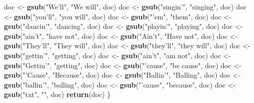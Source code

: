 \documentclass[]{article}
\newenvironment{Shaded}{\begin{snugshade}}{\end{snugshade}}
\newcommand{\KeywordTok}[1]{\textcolor[rgb]{0.13,0.29,0.53}{\textbf{#1}}}
\newcommand{\NormalTok}[1]{#1}
\newcommand{\StringTok}[1]{\textcolor[rgb]{0.31,0.60,0.02}{#1}}
\begin{document}
\begin{Shaded}
\begin{Highlighting}[]
\NormalTok{  doc <-}\StringTok{ }\KeywordTok{gsub}\NormalTok{(}\StringTok{"We'll"}\NormalTok{, }\StringTok{"We will"}\NormalTok{, doc)}
\NormalTok{  doc <-}\StringTok{ }\KeywordTok{gsub}\NormalTok{(}\StringTok{"singin'"}\NormalTok{, }\StringTok{"singing"}\NormalTok{, doc)}
\NormalTok{  doc <-}\StringTok{ }\KeywordTok{gsub}\NormalTok{(}\StringTok{"you'll"}\NormalTok{, }\StringTok{"you will"}\NormalTok{, doc)}
\NormalTok{  doc <-}\StringTok{ }\KeywordTok{gsub}\NormalTok{(}\StringTok{"'em"}\NormalTok{, }\StringTok{"them"}\NormalTok{, doc)}
\NormalTok{  doc <-}\StringTok{ }\KeywordTok{gsub}\NormalTok{(}\StringTok{"dancin'"}\NormalTok{, }\StringTok{"dancing"}\NormalTok{, doc)}
\NormalTok{  doc <-}\StringTok{ }\KeywordTok{gsub}\NormalTok{(}\StringTok{"playin'"}\NormalTok{, }\StringTok{"playing"}\NormalTok{, doc)}
\NormalTok{  doc <-}\StringTok{ }\KeywordTok{gsub}\NormalTok{(}\StringTok{"ain't"}\NormalTok{, }\StringTok{"have not"}\NormalTok{, doc)}
\NormalTok{  doc <-}\StringTok{ }\KeywordTok{gsub}\NormalTok{(}\StringTok{"Ain't"}\NormalTok{, }\StringTok{"Have not"}\NormalTok{, doc)}
\NormalTok{  doc <-}\StringTok{ }\KeywordTok{gsub}\NormalTok{(}\StringTok{"They'll"}\NormalTok{, }\StringTok{"They will"}\NormalTok{, doc)}
\NormalTok{  doc <-}\StringTok{ }\KeywordTok{gsub}\NormalTok{(}\StringTok{"they'll"}\NormalTok{, }\StringTok{"they will"}\NormalTok{, doc)}
\NormalTok{  doc <-}\StringTok{ }\KeywordTok{gsub}\NormalTok{(}\StringTok{"gettin'"}\NormalTok{, }\StringTok{"getting"}\NormalTok{, doc)}
\NormalTok{  doc <-}\StringTok{ }\KeywordTok{gsub}\NormalTok{(}\StringTok{"ain't"}\NormalTok{, }\StringTok{"am not"}\NormalTok{, doc)}
\NormalTok{  doc <-}\StringTok{ }\KeywordTok{gsub}\NormalTok{(}\StringTok{"Gettin'"}\NormalTok{, }\StringTok{"getting"}\NormalTok{, doc)}
\NormalTok{  doc <-}\StringTok{ }\KeywordTok{gsub}\NormalTok{(}\StringTok{"'cause"}\NormalTok{, }\StringTok{"be cause"}\NormalTok{, doc)}
\NormalTok{  doc <-}\StringTok{ }\KeywordTok{gsub}\NormalTok{(}\StringTok{"'Cause"}\NormalTok{, }\StringTok{"Because"}\NormalTok{, doc)}
\NormalTok{  doc <-}\StringTok{ }\KeywordTok{gsub}\NormalTok{(}\StringTok{"Ballin'"}\NormalTok{, }\StringTok{"Balling"}\NormalTok{, doc)}
\NormalTok{  doc <-}\StringTok{ }\KeywordTok{gsub}\NormalTok{(}\StringTok{"ballin'"}\NormalTok{, }\StringTok{"balling"}\NormalTok{, doc)}
\NormalTok{  doc <-}\StringTok{ }\KeywordTok{gsub}\NormalTok{(}\StringTok{"'cause"}\NormalTok{, }\StringTok{"because"}\NormalTok{, doc)}
\NormalTok{  doc <-}\StringTok{ }\KeywordTok{gsub}\NormalTok{(}\StringTok{"txt"}\NormalTok{, }\StringTok{""}\NormalTok{, doc)}
  \KeywordTok{return}\NormalTok{(doc)}
\NormalTok{\}}



\end{Highlighting}
\end{Shaded}
\end{document}
